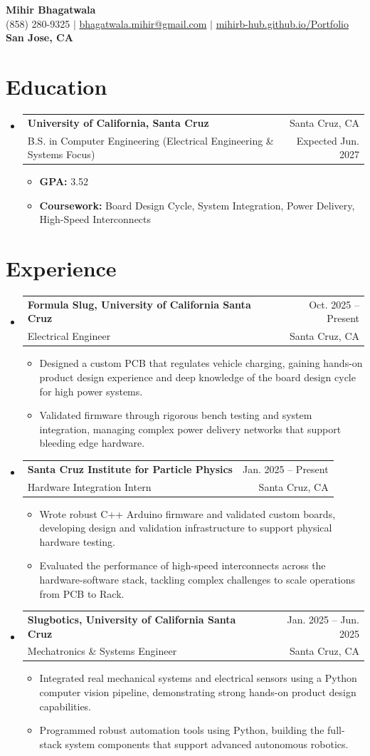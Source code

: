 \documentclass[letterpaper,11pt]{article}
\makeatletter
\newcommand{\resumeItem}[1]{\item{#1}}
\newcommand{\resumeSubheading}[4]{
  \item
    \begin{tabular*}{0.97\textwidth}[t]{l@{\extracolsep{\fill}}r}
      \textbf{#1} & #2 \\
      #3 & #4 \\
    \end{tabular*}
}
\newcommand{\resumeSubHeadingListStart}{\begin{itemize}[label=\textbullet]}
\newcommand{\resumeSubHeadingListEnd}{\end{itemize}}
\newcommand{\resumeItemListStart}{\begin{itemize}[label=-]}
\newcommand{\resumeItemListEnd}{\end{itemize}}
\makeatother
\begin{document}
\begin{center}
  {\Large\bfseries Mihir Bhagatwala} \\
  {(858) 280-9325 $\vert$ \href{mailto:bhagatwala.mihir@gmail.com}{bhagatwala.mihir@gmail.com} $\vert$ \href{https://mihirb-hub.github.io/Portfolio/}{mihirb-hub.github.io/Portfolio}} \\
  {\textbf{San Jose, CA}}
\end{center}

\section{Education}
\resumeSubHeadingListStart
  \resumeSubheading{University of California, Santa Cruz}{Santa Cruz, CA}{B.S. in Computer Engineering (Electrical Engineering \& Systems Focus)}{Expected Jun. 2027}
  \resumeItemListStart
    \resumeItem{\textbf{GPA:} 3.52}
    \resumeItem{\textbf{Coursework:} Board Design Cycle, System Integration, Power Delivery, High-Speed Interconnects}
  \resumeItemListEnd
\resumeSubHeadingListEnd

\section{Experience}
\resumeSubHeadingListStart
  \resumeSubheading{Formula Slug, University of California Santa Cruz}{Oct. 2025 -- Present}{Electrical Engineer}{Santa Cruz, CA}
  \resumeItemListStart
    \resumeItem{Designed a custom PCB that regulates vehicle charging, gaining hands-on product design experience and deep knowledge of the board design cycle for high power systems.}
    \resumeItem{Validated firmware through rigorous bench testing and system integration, managing complex power delivery networks that support bleeding edge hardware.}
  \resumeItemListEnd

  \resumeSubheading{Santa Cruz Institute for Particle Physics}{Jan. 2025 -- Present}{Hardware Integration Intern}{Santa Cruz, CA}
  \resumeItemListStart
    \resumeItem{Wrote robust C++ Arduino firmware and validated custom boards, developing design and validation infrastructure to support physical hardware testing.}
    \resumeItem{Evaluated the performance of high-speed interconnects across the hardware-software stack, tackling complex challenges to scale operations from PCB to Rack.}
  \resumeItemListEnd

  \resumeSubheading{Slugbotics, University of California Santa Cruz}{Jan. 2025 -- Jun. 2025}{Mechatronics \& Systems Engineer}{Santa Cruz, CA}
  \resumeItemListStart
    \resumeItem{Integrated real mechanical systems and electrical sensors using a Python computer vision pipeline, demonstrating strong hands-on product design capabilities.}
    \resumeItem{Programmed robust automation tools using Python, building the full-stack system components that support advanced autonomous robotics.}
  \resumeItemListEnd
\resumeSubHeadingListEnd
\end{document}
